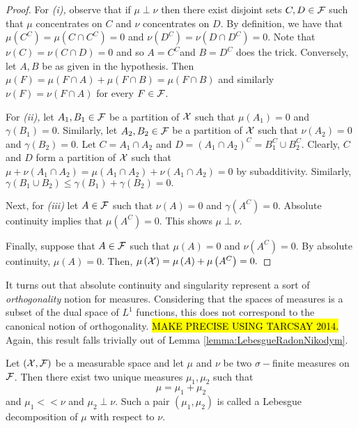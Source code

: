 \begin{proof}
For \emph{(i), }observe that if $\mu\perp\nu$ then there exist disjoint
sets $C,D\in\mathcal{F}$ such that $\mu$ concentrates on $C$ and $\nu$
concentrates on $D.$ By definition, we have that $\mu\left(C^{C}\right)=\mu\left(C\cap C^{C}\right)=0$
and $\nu\left(D^{C}\right)=\nu\left(D\cap D^{C}\right)=0.$ Note that
$\nu\left(C\right)=\nu\left(C\cap D\right)=0$ and so $A=C^{C}$and
$B=D^{C}$ does the trick. Conversely, let $A,B$ be as given in the
hypothesis. Then $\mu\left(F\right)=\mu\left(F\cap A\right)+\mu\left(F\cap B\right)=\mu\left(F\cap B\right)$
and similarly $\nu\left(F\right)=\nu\left(F\cap A\right)$ for every
$F\in\mathcal{F}$.

For \emph{(ii), }let $A_{1},B_{1}\in\mathcal{F}$ be a partition of $\mathcal{X}$ such
that $\mu\left(A_{1}\right)=0$ and $\gamma\left(B_{1}\right)=0.$
Similarly, let $A_{2},B_{2}\in\mathcal{F}$ be a partition of $\mathcal{X}$ such that
$\nu\left(A_{2}\right)=0$ and $\gamma\left(B_{2}\right)=0.$ Let
$C=A_{1}\cap A_{2}$ and $D=\left(A_{1}\cap A_{2}\right)^{C}=B_{1}^{C}\cup B_{2}^{C}.$
Clearly, $C$ and $D$ form a partition of $\mathcal{X}$ such that $\mu+\nu\left(A_{1}\cap A_{2}\right)=\mu\left(A_{1}\cap A_{2}\right)+\nu\left(A_{1}\cap A_{2}\right)=0$
by subadditivity. Similarly, $\gamma\left(B_{1}\cup B_{2}\right)\leq\gamma\left(B_{1}\right)+\gamma\left(B_{2}\right)=0.$

Next, for \emph{(iii) }let $A\in\mathcal{F}$ such that $\nu\left(A\right)=0$
and $\gamma\left(A^{C}\right)=0$. Absolute continuity implies that
$\mu\left(A^{C}\right)=0.$ This shows $\mu\perp\nu.$

Finally, suppose that $A\in\mathcal{F}$ such that $\mu\left(A\right)=0$ and
$\nu\left(A^{C}\right)=0.$ By absolute continuity, $\mu\left(A\right)=0.$
Then, $\mu\left(\mathcal{X}\right)=\mu\left(A\right)+\mu\left(A^{C}\right)=0.$
\end{proof}
It turns out that absolute continuity and singularity represent a
sort of \emph{orthogonality }notion for measures. Considering that
the spaces of measures is a subset of the dual space of $L^{1}$ functions,
this does not correspond to the canonical notion of orthogonality.
\hl{MAKE PRECISE USING TARCSAY 2014. }Again, this result falls trivially
out of Lemma \ref{lemma:LebesgueRadonNikodym}.
\begin{thm}
\label{thm:lebesgueDecomposition}Let $\left(\mathcal{X},\mathcal{F}\right)$ be a measurable
space and let $\mu$ and $\nu$ be two $\sigma-$finite measures on
$\mathcal{F}$. Then there exist two unique measures $\mu_{1},\mu_{2}$ such
that 
\[
\mu=\mu_{1}+\mu_{2}
\]
and $\mu_{1}<<\nu$ and $\mu_{2}\perp\nu$. Such a pair $\left(\mu_{1},\mu_{2}\right)$
is called a Lebesgue decomposition of $\mu$ with respect to $\nu$.
\end{thm}


